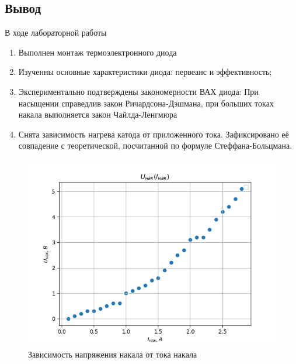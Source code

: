 \documentclass[a4paper]{article}
\begin{document}
\subsection{Вывод}

В ходе лабораторной работы
\begin{enumerate}
    \item Выполнен монтаж термоэлектронного диода
    \item Изученны основные характеристики диода: первеанс и эффективность;

    \item Экспериментально подтверждены закономерности ВАХ диода: При насыщении справедлив закон Ричардсона-Дэшмана, при больших токах накала выполняется закон Чайлда-Ленгмюра

    \item Снята зависимость нагрева катода от приложенного тока. Зафиксировано её совпадение с теоретической, посчитанной по формуле Стеффана-Больцмана.

\end{enumerate}


\newpage

\begin{figure}[h]
\begin{center}
\includegraphics[width=13cm]{./Diode/fig1.PNG}
\caption{Зависимость напряжения накала от тока накала}
\label{ris:experimoriginal} %
\end{center}
\end{figure}
\end{document}
